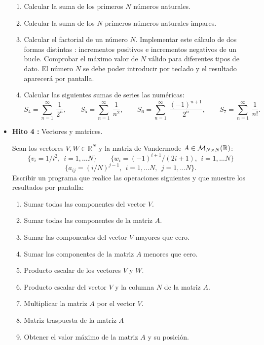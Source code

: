 \documentclass[12pt,spanish]{article}
\begin{document}
\begin{itemize}
\begin{enumerate}    
	\item Calcular la suma de los primeros $ N $  números naturales.
	
	\item Calcular la suma de los $ N $  primeros números naturales impares.
	
	\item Calcular el factorial de un número $ N $. Implementar este cálculo de dos
	formas distintas : incrementos positivos e incrementos negativos de un  bucle. 
    Comprobar el máximo valor de $N$ válido para diferentes tipos de dato.
    El número $ N $ se debe poder introducir por teclado y el resultado aparecerá
	por pantalla. 
	\item Calcular 
	 las siguientes sumas de series las numéricas: 	
	$$
	S_4 = \sum _{n=1} ^{\infty}  \  \frac{ 1 }{  2^n  }, \qquad 
	S_5 = \sum _{n=1} ^{\infty}  \  \frac{ 1 }{  n^2  }, \qquad  
	S_6 = \sum _{n=1} ^{\infty}  \  \frac{  (-1)^{n+1} }{  2^n  }, \qquad
	S_7 =\sum _{n=1} ^{\infty} \ \frac{ 1 } { n ! }. \qquad  
	$$
	
\end{enumerate}         

\newpage

\item {\bf Hito 4 :}   Vectores y matrices. 

Sean los vectores $V, W \in \mathbb{R}^N$ y la matriz de Vandermode $A \in 
{\cal M}_{N \times N} (\mathbb{R})$: 
$$
\{ v_i =  1/i^2, \ \  i=1, \ldots N \} \qquad  \{  w_i = (-1)^{i+1}/(2i+1), \ \   i=1, \ldots N  \} 
$$
$$
\{ a_{ij} = (i/N)^{j-1}, \ \ i=1, \ldots N, \ \  j=1, \ldots N \}. 
$$
Escribir un programa que realice las operaciones siguientes y que muestre los
resultados por pantalla: 
\begin{enumerate}
	\item Sumar todas las componentes del vector $V$. 
	\item Sumar todas las componentes de la matriz $A$.   
	\item Sumar las componentes del vector $V$ mayores que cero.
	\item Sumar las componentes de la matriz $A$ menores que cero.   
	\item Producto escalar de los vectores $V$ y $W$.   
	\item Producto escalar del vector $V$ y la columna $N$ de la matriz $A$. 
	\item Multiplicar la matriz $A$ por el vector $V$.
	\item Matriz traspuesta de la matriz $A$   
	\item Obtener el valor máximo de la matriz $A$ y su posición.
\end{enumerate}


\end{itemize}
\end{document}
